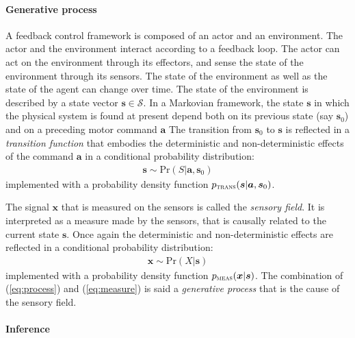 \documentclass[12pt,twoside,openright]{article}
\begin{document}
\paragraph{Generative process}
A feedback control framework is composed of an actor and an environment. The actor and the environment interact according to a feedback loop. 
The actor can act on the environment through its effectors, and sense the state of the environment through its sensors. 
The state of the environment as well as the state of the agent can change over time. The state of the environment is described by a state vector $\boldsymbol{s} \in \mathcal{S}$.
In a Markovian framework, the state $\boldsymbol{s}$ in which the physical system is found at present depend both on its previous state (say $\boldsymbol{s}_0$) and on a preceding motor command $\boldsymbol{a}$ 
The transition from $\boldsymbol{s}_0$ to $\boldsymbol{s}$ is reflected in a \emph{transition function} that embodies the deterministic and non-deterministic effects of the command $\boldsymbol{a}$ in a conditional probability distribution:  
\begin{align}
\boldsymbol{s} \sim \text{Pr}(S|\boldsymbol{a},\boldsymbol{s}_0) \label{eq:process}
\end{align}
implemented with a probability density function 
$p_\text{\sc trans}(\boldsymbol{s}|\boldsymbol{a},\boldsymbol{s}_0)$.


The signal $\boldsymbol{x}$ that is measured on the sensors is called the \emph{sensory field}. It is interpreted as a measure made by the sensors, that is causally related to the current state $\boldsymbol{s}$. Once again the deterministic and non-deterministic effects are reflected in a conditional probability distribution:
\begin{align}
\boldsymbol{x} \sim \text{Pr}(X|\boldsymbol{s})\label{eq:measure}
\end{align}
implemented with a probability density function 
$p_\text{\sc meas}(\boldsymbol{x}|\boldsymbol{s})$.
The combination of  (\ref{eq:process}) and (\ref{eq:measure}) is said a \emph{generative process} that is the cause of the sensory field. 


\paragraph{Inference}
\end{document}
